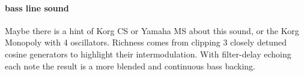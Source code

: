 \paragraph{bass line sound}
Maybe there is a hint of Korg CS or Yamaha MS about this sound, or 
the Korg Monopoly with 4 oscillators. Richness comes from
clipping 3 closely detuned cosine generators to highlight
their intermodulation. With filter-delay echoing each note
the result is a more blended and continuous bass backing.